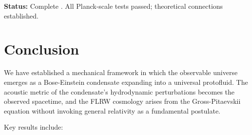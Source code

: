 \documentclass[11pt,a4paper]{article}
\theoremstyle{definition}
\theoremstyle{remark}
\begin{document}
\textbf{Status:} Complete \cite{Paper7}. All Planck-scale tests passed; theoretical connections established.

\section{Conclusion}
\label{sec:conclusion}

We have established a mechanical framework in which the observable universe emerges as a Bose-Einstein condensate expanding into a universal protofluid. The acoustic metric of the condensate's hydrodynamic perturbations becomes the observed spacetime, and the FLRW cosmology arises from the Gross-Pitaevskii equation without invoking general relativity as a fundamental postulate.

Key results include:
\end{document}
